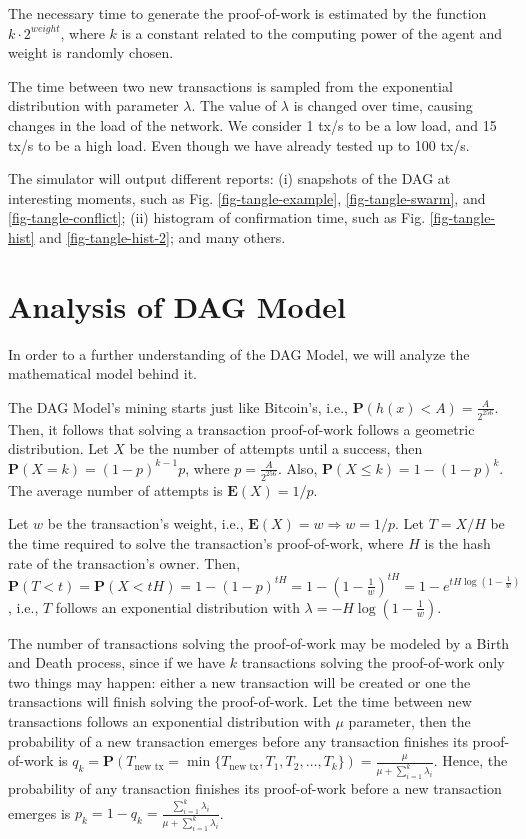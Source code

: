 The necessary time to generate the proof-of-work is estimated by the function $k \cdot 2^{weight}$, where $k$ is a constant related to the computing power of the agent and weight is randomly chosen.

The time between two new transactions is sampled from the exponential distribution with parameter $\lambda$. The value of $\lambda$ is changed over time, causing changes in the load of the network. We consider 1 tx/s to be a low load, and 15 tx/s to be a high load. Even though we have already tested up to 100 tx/s.

The simulator will output different reports: (i) snapshots of the DAG at interesting moments, such as Fig. \ref{fig-tangle-example}, \ref{fig-tangle-swarm}, and \ref{fig-tangle-conflict}; (ii) histogram of confirmation time, such as Fig. \ref{fig-tangle-hist} and \ref{fig-tangle-hist-2}; and many others.

\chapter{Analysis of DAG Model}

In order to a further understanding of the DAG Model, we will analyze the mathematical model behind it.

The DAG Model's mining starts just like Bitcoin's, i.e., $\mathbf{P}(h(x) < A) = \frac{A}{2^{256}}$. Then, it follows that solving a transaction proof-of-work follows a geometric distribution. Let $X$ be the number of attempts until a success, then $\mathbf{P}(X=k) = (1-p)^{k-1}p$, where $p=\frac{A}{2^{256}}$. Also, $\mathbf{P}(X \leq k)=1-(1-p)^k$. The average number of attempts is $\mathbf{E}(X)=1/p$.

Let $w$ be the transaction's weight, i.e., $\mathbf{E}(X)=w \Rightarrow w = 1/p$. Let $T = X/H$ be the time required to solve the transaction's proof-of-work, where $H$ is the hash rate of the transaction's owner. Then, $\mathbf{P}(T < t) = \mathbf{P}(X < tH) = 1 - (1 - p)^{tH} = 1 - \left( 1 - \frac{1}{w} \right)^{tH} = 1 - e^{tH \log\left(1 - \frac{1}{w} \right)}$, i.e., $T$ follows an exponential distribution with $\lambda = -H \log\left(1 - \frac{1}{w} \right)$.


The number of transactions solving the proof-of-work may be modeled by a Birth and Death process, since if we have $k$ transactions solving the proof-of-work only two things may happen: either a new transaction will be created or one the transactions will finish solving the proof-of-work. Let the time between new transactions follows an exponential distribution with $\mu$ parameter, then the probability of a new transaction emerges before any transaction finishes its proof-of-work is $q_k = \mathbf{P}(T_{\text{new tx}} = \min\{T_{\text{new tx}}, T_1, T_2, \dots, T_k\}) = \frac{\mu}{\mu + \sum_{i=1}^k \lambda_i}$. Hence, the probability of any transaction finishes its proof-of-work before a new transaction emerges is $p_k = 1 - q_k = \frac{\sum_{i=1}^k \lambda_i}{\mu + \sum_{i=1}^k \lambda_i}$.

